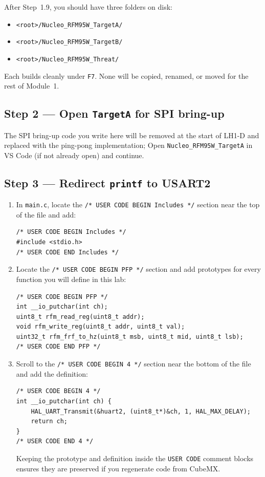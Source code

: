 \documentclass[11pt,letterpaper]{article}
\begin{document}
After Step~1.9, you should have three folders on disk:
\begin{itemize}[leftmargin=2em]
	\item \texttt{<root>/Nucleo\_RFM95W\_TargetA/}
	\item \texttt{<root>/Nucleo\_RFM95W\_TargetB/}
	\item \texttt{<root>/Nucleo\_RFM95W\_Threat/}
\end{itemize}
Each builds cleanly under \texttt{F7}. None will be copied, renamed, or moved for the rest of Module~1.

\newpage
\subsection{Step 2 --- Open \texttt{TargetA} for SPI bring-up}
The SPI bring-up code you write here will be removed at the start of LH1-D and replaced with the ping-pong implementation; Open \texttt{Nucleo\_RFM95W\_TargetA} in VS Code (if not already open) and continue.

\subsection{Step 3 --- Redirect \texttt{printf} to USART2}
\begin{enumerate}[leftmargin=2em]
	\item In \texttt{main.c}, locate the \texttt{/* USER CODE BEGIN Includes */} section near the top of the file and add:
\begin{verbatim}
/* USER CODE BEGIN Includes */
#include <stdio.h>
/* USER CODE END Includes */
\end{verbatim}
	\item Locate the \texttt{/* USER CODE BEGIN PFP */} section and add prototypes for every function you will define in this lab:
\begin{verbatim}
/* USER CODE BEGIN PFP */
int __io_putchar(int ch);
uint8_t rfm_read_reg(uint8_t addr);
void rfm_write_reg(uint8_t addr, uint8_t val);
uint32_t rfm_frf_to_hz(uint8_t msb, uint8_t mid, uint8_t lsb);
/* USER CODE END PFP */
\end{verbatim}
	\item Scroll to the \texttt{/* USER CODE BEGIN 4 */} section near the bottom of the file and add the definition:
\begin{verbatim}
/* USER CODE BEGIN 4 */
int __io_putchar(int ch) {
    HAL_UART_Transmit(&huart2, (uint8_t*)&ch, 1, HAL_MAX_DELAY);
    return ch;
}
/* USER CODE END 4 */
\end{verbatim}
	Keeping the prototype and definition inside the \texttt{USER CODE} comment blocks ensures they are preserved if you regenerate code from CubeMX.
\end{enumerate}
\end{document}
